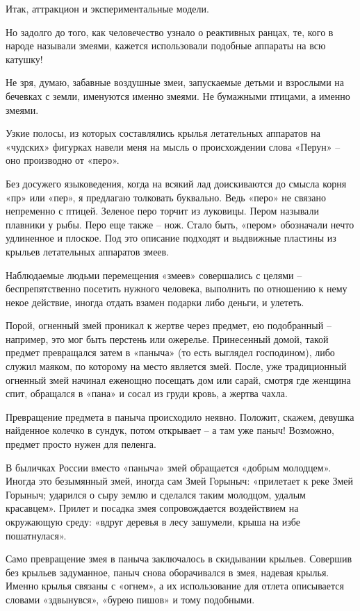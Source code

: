 Итак, аттракцион и экспериментальные модели.

Но задолго до того, как человечество узнало о реактивных ранцах, те, кого в народе называли змеями, кажется использовали подобные аппараты на всю катушку!

Не зря, думаю, забавные воздушные змеи, запускаемые детьми и взрослыми на бечевках с земли, именуются именно змеями. Не бумажными птицами, а именно змеями.

Узкие полосы, из которых составлялись крылья летательных аппаратов на «чудских» фигурках навели меня на мысль о происхождении слова «Перун» – оно производно от «перо». 

Без досужего языковедения, когда на всякий лад доискиваются до смысла корня «пр» или «пер», я предлагаю толковать буквально. Ведь «перо» не связано непременно с птицей. Зеленое перо торчит из луковицы. Пером называли плавники у рыбы. Перо еще также – нож. Стало быть, «пером» обозначали нечто удлиненное и плоское. Под это описание подходят и выдвижные пластины из крыльев летательных аппаратов змеев.

Наблюдаемые людьми перемещения «змеев» совершались с целями – беспрепятственно посетить нужного человека, выполнить по отношению к нему некое действие, иногда отдать взамен подарки либо деньги, и улететь.

Порой, огненный змей проникал к жертве через предмет, ею подобранный – например, это мог быть перстень или ожерелье. Принесенный домой, такой предмет превращался затем в «паныча» (то есть  выглядел господином), либо служил маяком, по которому на место является змей. После, уже традиционный огненный змей начинал еженощно посещать дом или сарай, смотря где женщина спит, обращался в «пана» и сосал из груди кровь, а жертва чахла. 

Превращение предмета в паныча происходило неявно. Положит, скажем, девушка найденное колечко в сундук, потом открывает – а там уже паныч! Возможно, предмет просто нужен для пеленга.

В быличках России вместо «паныча» змей обращается «добрым молодцем». Иногда это безымянный змей, иногда сам Змей Горыныч: «прилетает к реке Змей Горыныч; ударился о сыру землю и сделался таким молодцом, удалым красавцем». Прилет и посадка змея сопровождается воздействием на окружающую среду: «вдруг деревья в лесу зашумели, крыша на избе пошатнулася».

Само превращение змея в паныча заключалось в скидывании крыльев. Совершив без крыльев задуманное, паныч снова оборачивался в змея, надевая крылья. Именно крылья связаны с «огнем», а их использование для отлета описывается словами «здвынувся», «бурею пишов» и тому подобными.

